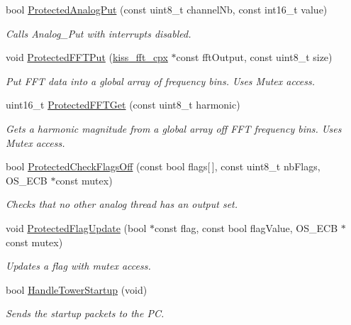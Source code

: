 \begin{DoxyCompactItemize}
bool \hyperlink{group__main__module_gac7b38383eb6bcd18c7a9f65ec091cfb3}{Protected\+Analog\+Put} (const uint8\+\_\+t channel\+Nb, const int16\+\_\+t value)
\begin{DoxyCompactList}\small\item\em Calls Analog\+\_\+\+Put with interrupts disabled. \end{DoxyCompactList}\item 
void \hyperlink{group__main__module_ga061d60c1630d2d24cae1503a3928eaed}{Protected\+F\+F\+T\+Put} (\hyperlink{structkiss__fft__cpx}{kiss\+\_\+fft\+\_\+cpx} $\ast$const fft\+Output, const uint8\+\_\+t size)
\begin{DoxyCompactList}\small\item\em Put F\+F\+T data into a global array of frequency bins. Uses Mutex access. \end{DoxyCompactList}\item 
uint16\+\_\+t \hyperlink{group__main__module_gacd7e92f8af4e43c2324b2cdf473f522a}{Protected\+F\+F\+T\+Get} (const uint8\+\_\+t harmonic)
\begin{DoxyCompactList}\small\item\em Gets a harmonic magnitude from a global array off F\+F\+T frequency bins. Uses Mutex access. \end{DoxyCompactList}\item 
bool \hyperlink{group__main__module_ga283c8978a35cdac92f6589de8542d789}{Protected\+Check\+Flags\+Off} (const bool flags\mbox{[}$\,$\mbox{]}, const uint8\+\_\+t nb\+Flags, O\+S\+\_\+\+E\+C\+B $\ast$const mutex)
\begin{DoxyCompactList}\small\item\em Checks that no other analog thread has an output set. \end{DoxyCompactList}\item 
void \hyperlink{group__main__module_ga7fe9a1a6602df9e2831a5ed46a0792d8}{Protected\+Flag\+Update} (bool $\ast$const flag, const bool flag\+Value, O\+S\+\_\+\+E\+C\+B $\ast$const mutex)
\begin{DoxyCompactList}\small\item\em Updates a flag with mutex access. \end{DoxyCompactList}\item 
bool \hyperlink{group__main__module_ga8703dc5d6d6c78462c6d19eefcd594c7}{Handle\+Tower\+Startup} (void)
\begin{DoxyCompactList}\small\item\em Sends the startup packets to the P\+C. \end{DoxyCompactList}\item 

\end{DoxyCompactItemize}
